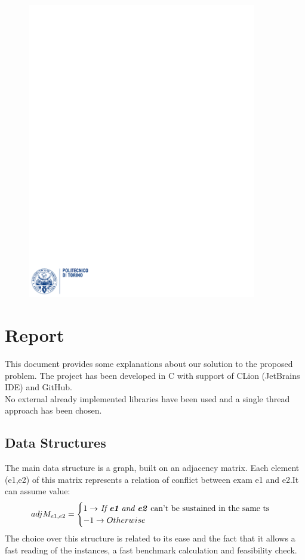 \documentclass[12pt]{article}
\begin{document}
\begin{figure}
  \centering
  \includegraphics[width=10cm]{images/polito.pdf}
\end{figure}

\maketitle %
\newpage

\section{Report}
This document provides some explanations about our solution to the proposed problem. The project has been developed in C with support of CLion (JetBrains IDE) and GitHub.
\\No external already implemented libraries have been used and a single thread approach has been chosen.

\subsection{Data Structures}
The main data structure is a graph, built on an adjacency matrix. Each element (e1,e2) of this matrix represents a relation of conflict between exam e1 and e2.It  can assume value:
\begin{equation}
  \begin{gathered}
    adjM_{e1,e2} = \begin{cases} 1 \rightarrow $ \textit{If \textbf{e1} and \textbf{e2}} can't be sustained in the same ts$ \\ -1 \rightarrow Otherwise \end{cases}
  \end{gathered}
\end{equation}
The choice over this structure is related to its ease and the fact that it allows a fast reading of the instances, a fast benchmark calculation and feasibility check.
\end{document}
